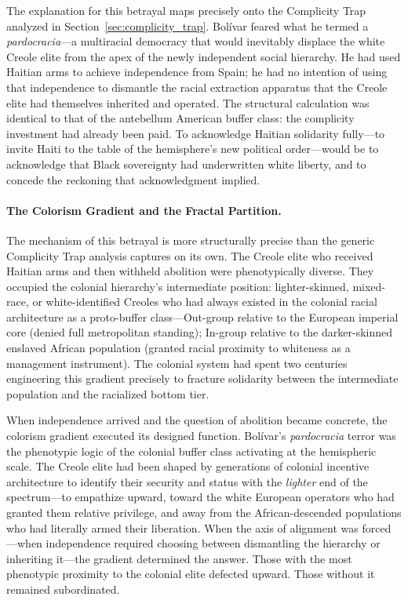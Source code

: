 The explanation for this betrayal maps precisely onto the Complicity Trap analyzed in Section~\ref{sec:complicity_trap}. Bolívar feared what he termed a \textit{pardocracia}---a multiracial democracy that would inevitably displace the white Creole elite from the apex of the newly independent social hierarchy. He had used Haitian arms to achieve independence from Spain; he had no intention of using that independence to dismantle the racial extraction apparatus that the Creole elite had themselves inherited and operated. The structural calculation was identical to that of the antebellum American buffer class: the complicity investment had already been paid. To acknowledge Haitian solidarity fully---to invite Haiti to the table of the hemisphere's new political order---would be to acknowledge that Black sovereignty had underwritten white liberty, and to concede the reckoning that acknowledgment implied.

\paragraph{The Colorism Gradient and the Fractal Partition.}
The mechanism of this betrayal is more structurally precise than the generic Complicity Trap analysis captures on its own. The Creole elite who received Haitian arms and then withheld abolition were phenotypically diverse. They occupied the colonial hierarchy's intermediate position: lighter-skinned, mixed-race, or white-identified Creoles who had always existed in the colonial racial architecture as a proto-buffer class---Out-group relative to the European imperial core (denied full metropolitan standing); In-group relative to the darker-skinned enslaved African population (granted racial proximity to whiteness as a management instrument). The colonial system had spent two centuries engineering this gradient precisely to fracture solidarity between the intermediate population and the racialized bottom tier.

When independence arrived and the question of abolition became concrete, the colorism gradient executed its designed function. Bolívar's \textit{pardocracia} terror was the phenotypic logic of the colonial buffer class activating at the hemispheric scale. The Creole elite had been shaped by generations of colonial incentive architecture to identify their security and status with the \textit{lighter} end of the spectrum---to empathize upward, toward the white European operators who had granted them relative privilege, and away from the African-descended populations who had literally armed their liberation. When the axis of alignment was forced---when independence required choosing between dismantling the hierarchy or inheriting it---the gradient determined the answer. Those with the most phenotypic proximity to the colonial elite defected upward. Those without it remained subordinated.

